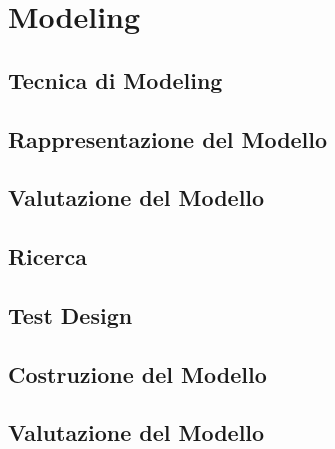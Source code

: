 \section{Modeling}

\subsection{Tecnica di Modeling}

\subsection{Rappresentazione del Modello}

\subsection{Valutazione del Modello}

\subsection{Ricerca}

\subsection{Test Design}

\subsection{Costruzione del Modello}

\subsection{Valutazione del Modello}

